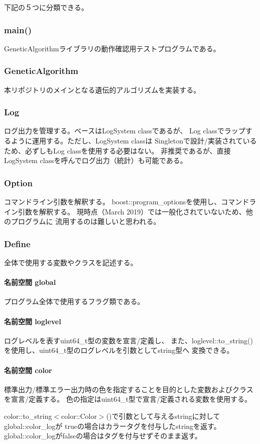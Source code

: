 下記の５つに分類できる。

\subsubsection*{main()}

Genetic\+Algorithmライブラリの動作確認用テストプログラムである。

\subsubsection*{Genetic\+Algorithm}

本リポジトリのメインとなる遺伝的アルゴリズムを実装する。

\subsubsection*{Log}

ログ出力を管理する。ベースは\+Log\+System classであるが、 Log classでラップするように運用する。ただし、\+Log\+System classは Singletonで設計/実装されているため、必ずしも\+Log classを使用する必要はない。 非推奨であるが、直接\+Log\+System classを呼んでログ出力（統計）も可能である。

\subsubsection*{Option}

コマンドライン引数を解釈する。 boost\+::program\+\_\+optionsを使用し、コマンドライン引数を解釈する。 現時点（\+March 2019）では一般化されていないため、他のプログラムに 流用するのは難しいと思われる。

\subsubsection*{Define}

全体で使用する変数やクラスを記述する。

\paragraph*{名前空間 global}

プログラム全体で使用するフラグ類である。

\paragraph*{名前空間 loglevel}

ログレベルを表すuint64\+\_\+t型の変数を宣言/定義し、 また、loglevel\+::to\+\_\+string()を使用し、uint64\+\_\+t型のログレベルを引数としてstring型へ 変換できる。

\paragraph*{名前空間 color}

標準出力/標準エラー出力時の色を指定することを目的とした変数およびクラスを宣言/定義する。 色の指定はuint64\+\_\+t型で宣言/定義される変数を使用する。

color\+::to\+\_\+string$<$color\+::\+Color$>$()で引数として与えるstringに対してglobal\+::color\+\_\+logが trueの場合はカラータグを付与したstringを返す。 global\+::color\+\_\+logがfalseの場合はタグを付与せずそのまま返す。 